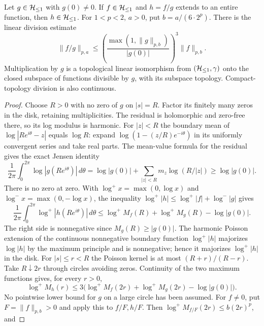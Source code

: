 \begin{cqlemma}
\label{thm:cq-division}
Let $g\in\mathcal H_{\leq 1}$ with $g(0)\ne0$. If $f\in\mathcal H_{\leq 1}$ and $h=f/g$
extends to an entire function, then $h\in\mathcal H_{\leq 1}$. For $1<p<2$,
$a>0$, put $b=a/(6\cdot2^p)$. There is the linear division estimate
\begin{equation}\label{eq:cq-division-bound}
 \|f/g\|_{p,a}\leq
 \left(\frac{\max(1,\|g\|_{p,b})}{|g(0)|}\right)^3
 \|f\|_{p,b}.
\end{equation}
Multiplication by $g$ is a topological linear isomorphism from
$(\mathcal H_{\leq 1},\gamma)$ onto the closed subspace of functions divisible by
$g$, with its subspace topology. Compact-topology division is also
continuous.
\end{cqlemma}
\begin{proof}
Choose $R>0$ with no zero of $g$ on $|s|=R$. Factor its finitely
many zeros in the disk, retaining multiplicities. The residual is
holomorphic and zero-free there, so its log modulus is harmonic.
For $|z|<R$ the boundary mean of $\log|Re^{i\theta}-z|$ equals
$\log R$: expand $\log(1-(z/R)e^{-i\theta})$ in its uniformly
convergent series and take real parts. The mean-value formula for
the residual gives the exact Jensen identity
\[
 \frac1{2\pi}\int_0^{2\pi}\log|g(Re^{i\theta})|\,d\theta
 =\log|g(0)|+\sum_{|z|<R}m_z\log(R/|z|)\geq\log|g(0)|.
\]
There is no zero at zero. With
$\log^+x=\max(0,\log x)$ and $\log^-x=\max(0,-\log x)$,
the inequality $\log^+|h|\leq\log^+|f|+\log^-|g|$ gives
\begin{equation}\label{eq:cq-division-mean}
 \frac1{2\pi}\int_0^{2\pi}\log^+|h(Re^{i\theta})|\,d\theta
 \leq\log^+M_f(R)+\log^+M_g(R)-\log|g(0)|.
\end{equation}
The right side is nonnegative since $M_g(R)\geq|g(0)|$.
The harmonic Poisson extension of the continuous nonnegative boundary
function $\log^+|h|$ majorizes $\log|h|$ by the maximum principle
and is nonnegative; hence it majorizes $\log^+|h|$ in the disk.
For $|s|\leq r<R$ the Poisson kernel is at most $(R+r)/(R-r)$.
Take $R\downarrow2r$ through circles avoiding zeros. Continuity of
the two maximum functions gives, for every $r>0$,
\begin{equation}\label{eq:cq-division-radial}
 \log^+M_h(r)\leq
 3\bigl(\log^+M_f(2r)+\log^+M_g(2r)-\log|g(0)|\bigr).
\end{equation}
No pointwise lower bound for $g$ on a large circle has been assumed.
For $f\ne0$, put $F=\|f\|_{p,b}>0$ and apply this to $f/F,h/F$.
Then $\log^+M_{f/F}(2r)\leq b(2r)^p$, and

\end{proof}
